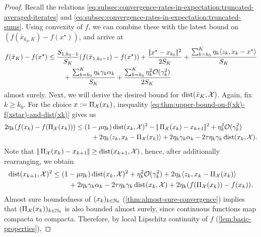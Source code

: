\begin{proof}
    Recall the relations \eqref{eq:subsec:convergence-rates-in-expectation:truncated-averaged-iterates} and
    \eqref{eq:subsec:convergence-rates-in-expectation:truncated-sums}.
    Using convexity of $f$, we can combine these with the latest bound on $(f(\bar{x}_{k_0, K}) - f(x^\star))$,
    and arrive at
    \begin{align*}
        f(\bar{x}_K) - f(x^\star)
        &\leq
        \frac{S_{1, k_0-1}}{S_K} (f(\bar{x}_{1, k_0-1}) - f(x^\star))
        +
        \frac{|\!|x^\star - x_{k_0}|\!|^2}{2S_K}
            + \frac{\sum_{k=k_0}^K \eta_k\langle z_k, x_k - x^\star \rangle}{S_K} \notag \\
        &\phantom{===}
            + \frac{\sum_{k=k_0}^K \eta_k\gamma_k\alpha_k}{S_K}
            + \frac{\sum_{k=k_0}^{K} \eta_k^2\mathcal{O}(\gamma_k^2)}{2 S_K}
    \end{align*}
    almost surely.
    Next, we will derive the desired bound for $\operatorname{dist}(\bar{x}_K, \mathcal{X})$.
    Again, fix $k \geq k_0$.
    For the choice $x := \operatorname{\Pi_\mathcal{X}}(x_k)$,
    inequality \eqref{eq:thm:upper-bound-on-f(xk)-f(xstar)-and-dist(xk)} gives us
    \begin{align*}
        2\eta_k (f(x_{k}) - f(\operatorname{\Pi_\mathcal{X}}(x_k)))
        &\leq
        (1-\mu\eta_k)\operatorname{dist}(x_k, \mathcal{X})^2 - |\!|\operatorname{\Pi_\mathcal{X}}(x_k) - x_{k+1}|\!|^2
            + \eta_k^2 \mathcal{O}(\gamma_k^2) \notag \\
            &\phantom{===} + 2\eta_k\langle z_k, x_k - \operatorname{\Pi_\mathcal{X}}(x_k) \rangle
                    + 2\eta_k\gamma_k\alpha_k - 2\tau \eta_k \gamma_k \operatorname{dist}(x_k, \mathcal{X}).
    \end{align*}
    Note that $|\!|\operatorname{\Pi_\mathcal{X}}(x_k) - x_{k+1}|\!| \geq \operatorname{dist}(x_{k+1}, \mathcal{X})$,
    hence, after additionally rearranging, we obtain
    \begin{align*}
        \operatorname{dist}(x_{k+1}, \mathcal{X})^2
        &\leq
        (1-\mu\eta_k)\operatorname{dist}(x_k, \mathcal{X})^2
            + \eta_k^2 \mathcal{O}(\gamma_k^2) + 2\eta_k\langle z_k, x_k - \operatorname{\Pi_\mathcal{X}}(x_k) \rangle \notag \\
            &\phantom{===}
                    + 2\eta_k\gamma_k\alpha_k - 2\tau \eta_k \gamma_k \operatorname{dist}(x_k, \mathcal{X}) + 2\eta_k (f(\operatorname{\Pi_\mathcal{X}}(x_k)) - f(x_{k})).
    \end{align*}
    Almost sure boundedness of $(x_k)_{k\in\mathbb{N}_0}$ (\cref{thm:almost-sure-convergence})
    implies that $(\Pi_\mathcal{X}(x_k))_{k\in\mathbb{N}_0}$ is also
    bounded almost surely, since continuous functions map compacta to compacta.
    Therefore, by
    local Lipschitz continuity of $f$ (\cref{lem:basic-properties}),

\end{proof}

